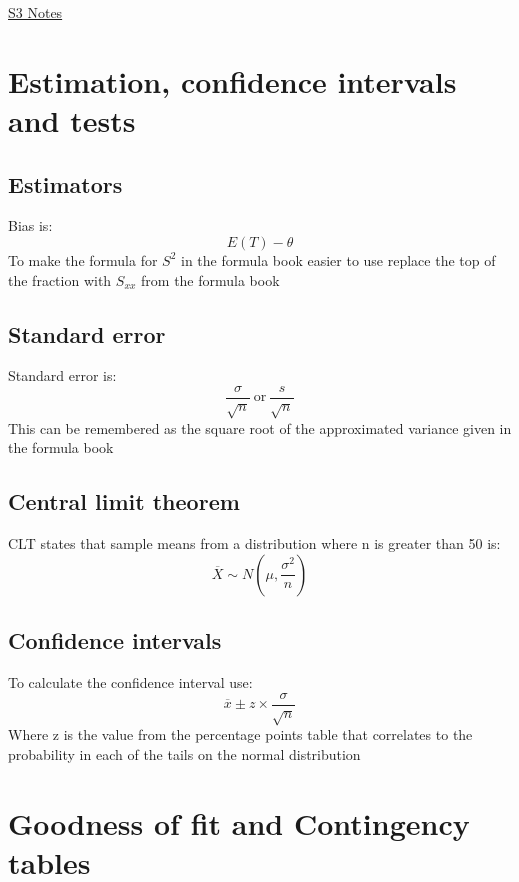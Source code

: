 \documentclass{article}[18pt]
\begin{document}
\begin{center}
\underline{\huge S3 Notes}
\end{center}
\section{Estimation, confidence intervals and tests}
\subsection{Estimators}
Bias is:
$$E(T)-\theta$$
To make the formula for $S^2$ in the formula book easier to use replace the top of the fraction with $S_{xx}$ from the formula book
\subsection{Standard error}
Standard error is:
$$\frac{\sigma}{\sqrt{n}} \ \textrm{or} \ \frac{s}{\sqrt{n}}$$
This can be remembered as the square root of the approximated variance given in the formula book
\subsection{Central limit theorem}
CLT states that sample means from a distribution where n is greater than 50 is:
$$\overline{X}\sim N(\mu,\frac{\sigma^2}{n})$$
\subsection{Confidence intervals}
To calculate the confidence interval use:
$$\overline{x}\pm z\times\frac{\sigma}{\sqrt{n}}$$
Where z is the value from the percentage points table that correlates to the probability in each of the tails on the normal distribution
\section{Goodness of fit and Contingency tables}
\end{document}
